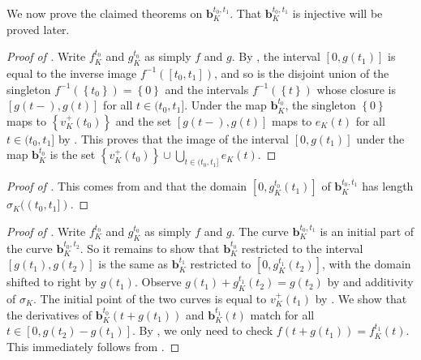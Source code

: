 We now prove the claimed theorems on \(\mathbf{b}_K^{t_0, t_1}\). That \(\mathbf{b}_K^{t_0, t_1}\) is injective will be proved later.

\begin{proof}[Proof of ]
Write \(f_K^{t_0}\) and \(g_K^{t_0}\) as simply \(f\) and \(g\). By , the interval \([0, g(t_1)]\) is equal to the inverse image \(f^{-1} ([t_0, t_1])\), and so is the disjoint union of the singleton \(f^{-1} (\left\{ t_0 \right\}) = \left\{ 0 \right\}\) and the intervals \(f ^{-1} (\left\{ t \right\})\) whose closure is \([g(t-), g(t)]\) for all \(t \in (t_0, t_1]\). Under the map \(\mathbf{b}_{K}^{t_0}\), the singleton \(\left\{ 0 \right\}\) maps to \(\left\{ v_K^+(t_0) \right\}\) and the set \([g(t-), g(t)]\) maps to \(e_K(t)\) for all \(t \in (t_0, t_1]\) by . This proves that the image of the interval \([0, g(t_1)]\) under the map \(\mathbf{b}_{K}^{t_0}\) is the set \(\left\{ v_K^+(t_0) \right\} \cup \bigcup_{t \in (t_0, t_1]} e_K(t)\).
\end{proof}

\begin{proof}[Proof of ]
This comes from  and that the domain \([0, g_{K}^{t_0}(t_1)]\) of \(\mathbf{b}_K^{t_0, t_1}\) has length \(\sigma_K((t_0, t_1])\).
\end{proof}

\begin{proof}[Proof of ]
Write \(f_K^{t_0}\) and \(g_K^{t_0}\) as simply \(f\) and \(g\). The curve \(\mathbf{b}_{K}^{t_0, t_1}\) is an initial part of the curve \(\mathbf{b}_{K}^{t_0, t_2}\). So it remains to show that \(\mathbf{b}_{K}^{t_0}\) restricted to the interval \([g(t_1), g(t_2)]\) is the same as \(\mathbf{b}_{K}^{t_1}\) restricted to \([0, g_K^{t_1}(t_2)]\), with the domain shifted to right by \(g(t_1)\). Observe \(g(t_1) + g_K^{t_1}(t_2) = g(t_2)\) by  and additivity of \(\sigma_K\). The initial point of the two curves is equal to \(v_K^+(t_1)\) by . We show that the derivatives of \(\mathbf{b}_{K}^{t_0}(t + g(t_1))\) and \(\mathbf{b}_{K}^{t_1}(t)\) match for all \(t \in [0, g(t_2) - g(t_1)]\). By , we only need to check \(f(t + g(t_1)) = f_K^{t_1} (t)\). This immediately follows from .
\end{proof}


